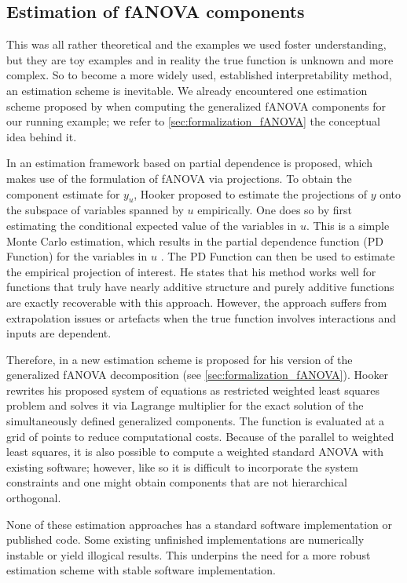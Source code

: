 \subsection{Estimation of fANOVA components}
This was all rather theoretical and the examples we used foster understanding, but they are toy examples and in reality the true function is unknown and more complex. So to become a more widely used, established interpretability method, an estimation scheme is inevitable.
We already encountered one estimation scheme proposed by \cite{rahman2014} when computing the generalized fANOVA components for our running example; we refer to \autoref{sec:formalization_fANOVA} the conceptual idea behind it.

In \cite{hooker2004} an estimation framework based on partial dependence is proposed, which makes use of the formulation of fANOVA via projections. To obtain the component estimate for $y_u$, Hooker proposed to estimate the projections of $y$ onto the subspace of variables spanned by $u$ empirically.
One does so by first estimating the conditional expected value of the variables in $u$. %
This is a simple Monte Carlo estimation, which results in the partial dependence function (PD Function) for the variables in $u$ \citep{hooker2004}.
The PD Function can then be used to estimate the empirical projection of interest. He states that his method works well for functions that truly have nearly additive structure and purely additive functions are exactly recoverable with this approach. However, the approach suffers from extrapolation issues or artefacts when the true function involves interactions and inputs are dependent.\par

Therefore, in \cite{hooker2007} a new estimation scheme is proposed for his version of the generalized fANOVA decomposition (see \autoref{sec:formalization_fANOVA}).
Hooker rewrites his proposed system of equations as restricted weighted least squares problem and solves it via Lagrange multiplier for the exact solution of the simultaneously defined generalized components.
The function is evaluated at a grid of points to reduce computational costs.
Because of the parallel to weighted least squares, it is also possible to compute a weighted standard ANOVA with existing software; however, like so it is difficult to incorporate the system constraints and one might obtain components that are not hierarchical orthogonal.\par

None of these estimation approaches has a standard software implementation or published code.
Some existing unfinished implementations are numerically instable or yield illogical results. This underpins the need for a more robust estimation scheme with stable software implementation.
